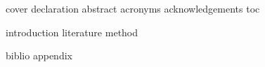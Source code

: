 \documentclass{article}
\begin{document}
{cover}
{declaration}
{abstract}
{acronyms}
{acknowledgements}
{toc}

{introduction}
{literature}
{method}

{biblio}
{appendix}
\end{document}
